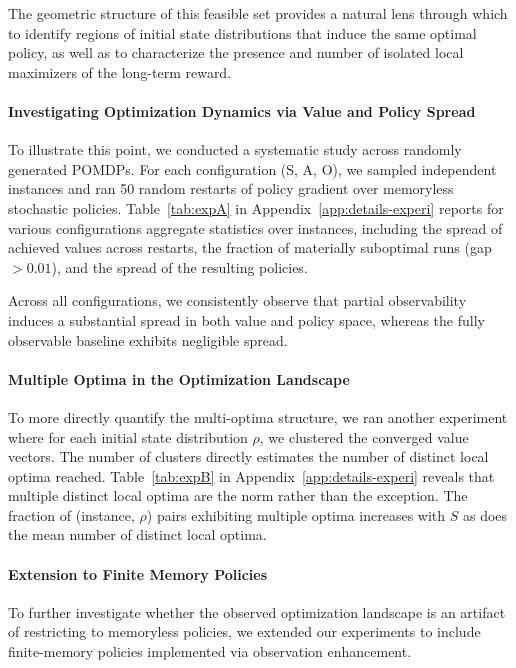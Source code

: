 \documentclass{article}
\theoremstyle{definition}
\theoremstyle{remark}
\begin{document}
The geometric structure of this feasible set provides a natural lens through which to identify regions of initial state distributions that induce the same optimal policy, as well as to characterize the presence and number of isolated local maximizers of the long-term reward.

\paragraph{Investigating Optimization Dynamics via Value and Policy Spread}
To illustrate this point, we conducted a systematic study across randomly generated POMDPs. For each configuration (S, A, O), we sampled independent instances and ran 50 random restarts of policy gradient over memoryless stochastic policies. Table~\ref{tab:expA} in Appendix~\ref{app:details-experi} reports for various configurations aggregate statistics over instances, including the spread of achieved values across restarts, the fraction of materially suboptimal runs (gap $> 0.01$), and the spread of the resulting policies.

Across all configurations, we consistently observe that partial observability induces a substantial spread in both value and policy space, whereas the fully observable baseline exhibits negligible spread.  

\paragraph{Multiple Optima in the Optimization Landscape}
To more directly quantify the multi-optima structure, we ran another experiment where for each initial state distribution $\rho$, we clustered the converged value vectors. The number of clusters directly estimates the number of distinct local optima reached. Table~\ref{tab:expB} in Appendix~\ref{app:details-experi} reveals that multiple distinct local optima are the norm rather than the exception. The fraction of (instance, $\rho$) pairs exhibiting multiple optima increases with $S$ as does the mean number of distinct local optima. 

\paragraph{Extension to Finite Memory Policies}
To further investigate whether the observed optimization landscape is an artifact of restricting to memoryless policies, we extended our experiments to include finite-memory policies implemented via observation enhancement. 
\end{document}
